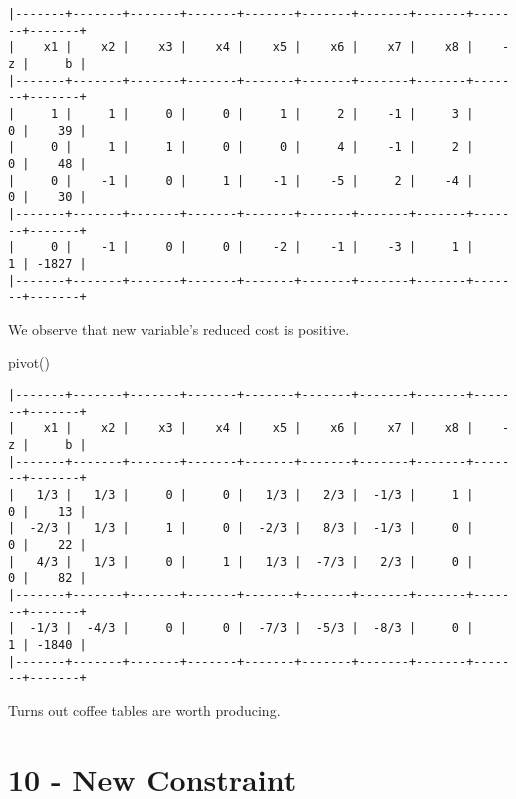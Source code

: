 \documentclass[
  letterpaper,
  DIV=11,
  numbers=noendperiod]{scrartcl}
\newenvironment{Shaded}{\begin{snugshade}}{\end{snugshade}}
\newcommand{\NormalTok}[1]{\textcolor[rgb]{0.00,0.23,0.31}{#1}}
\begin{document}
\begin{verbatim}
|-------+-------+-------+-------+-------+-------+-------+-------+-------+-------+
|    x1 |    x2 |    x3 |    x4 |    x5 |    x6 |    x7 |    x8 |    -z |     b |
|-------+-------+-------+-------+-------+-------+-------+-------+-------+-------+
|     1 |     1 |     0 |     0 |     1 |     2 |    -1 |     3 |     0 |    39 |
|     0 |     1 |     1 |     0 |     0 |     4 |    -1 |     2 |     0 |    48 |
|     0 |    -1 |     0 |     1 |    -1 |    -5 |     2 |    -4 |     0 |    30 |
|-------+-------+-------+-------+-------+-------+-------+-------+-------+-------+
|     0 |    -1 |     0 |     0 |    -2 |    -1 |    -3 |     1 |     1 | -1827 |
|-------+-------+-------+-------+-------+-------+-------+-------+-------+-------+
\end{verbatim}

\normalsize

We observe that new variable's reduced cost is positive.

\small

\begin{Shaded}
\begin{Highlighting}[]
\NormalTok{pivot()}
\end{Highlighting}
\end{Shaded}

\begin{verbatim}
|-------+-------+-------+-------+-------+-------+-------+-------+-------+-------+
|    x1 |    x2 |    x3 |    x4 |    x5 |    x6 |    x7 |    x8 |    -z |     b |
|-------+-------+-------+-------+-------+-------+-------+-------+-------+-------+
|   1/3 |   1/3 |     0 |     0 |   1/3 |   2/3 |  -1/3 |     1 |     0 |    13 |
|  -2/3 |   1/3 |     1 |     0 |  -2/3 |   8/3 |  -1/3 |     0 |     0 |    22 |
|   4/3 |   1/3 |     0 |     1 |   1/3 |  -7/3 |   2/3 |     0 |     0 |    82 |
|-------+-------+-------+-------+-------+-------+-------+-------+-------+-------+
|  -1/3 |  -4/3 |     0 |     0 |  -7/3 |  -5/3 |  -8/3 |     0 |     1 | -1840 |
|-------+-------+-------+-------+-------+-------+-------+-------+-------+-------+
\end{verbatim}

\normalsize

Turns out coffee tables are worth producing.

\newpage

\section{10 - New Constraint}\label{new-constraint}
\end{document}
